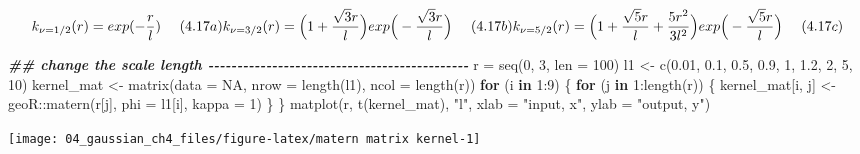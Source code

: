 \documentclass[
]{article}
\newenvironment{Shaded}{\begin{snugshade}}{\end{snugshade}}
\newcommand{\AttributeTok}[1]{\textcolor[rgb]{0.77,0.63,0.00}{#1}}
\newcommand{\ConstantTok}[1]{\textcolor[rgb]{0.00,0.00,0.00}{#1}}
\newcommand{\ControlFlowTok}[1]{\textcolor[rgb]{0.13,0.29,0.53}{\textbf{#1}}}
\newcommand{\DecValTok}[1]{\textcolor[rgb]{0.00,0.00,0.81}{#1}}
\newcommand{\DocumentationTok}[1]{\textcolor[rgb]{0.56,0.35,0.01}{\textbf{\textit{#1}}}}
\newcommand{\FloatTok}[1]{\textcolor[rgb]{0.00,0.00,0.81}{#1}}
\newcommand{\FunctionTok}[1]{\textcolor[rgb]{0.00,0.00,0.00}{#1}}
\newcommand{\NormalTok}[1]{#1}
\newcommand{\OtherTok}[1]{\textcolor[rgb]{0.56,0.35,0.01}{#1}}
\newcommand{\SpecialCharTok}[1]{\textcolor[rgb]{0.00,0.00,0.00}{#1}}
\newcommand{\StringTok}[1]{\textcolor[rgb]{0.31,0.60,0.02}{#1}}
\begin{document}
\[
k_{\nu=1/2}(r) = exp(-\frac r l) \ \ \ \ (4.17a)\\ 
k_{\nu=3/2}(r) = \Big(1 + \frac {\sqrt 3r} l \Big)
exp \Big(- \frac {\sqrt 3r} {l}\Big) \ \ \ \ (4.17b)\\ 
k_{\nu=5/2}(r) = \Big(1 + \frac {\sqrt 5r} l + 
\frac {5r^2} {3l^2}\Big) exp \Big(- \frac {\sqrt 5r} l\Big)
\ \ \ \ (4.17c)
\]

\begin{Shaded}
\begin{Highlighting}[]
\DocumentationTok{\#\# change the scale length {-}{-}{-}{-}{-}{-}{-}{-}{-}{-}{-}{-}{-}{-}{-}{-}{-}{-}{-}{-}{-}{-}{-}{-}{-}{-}{-}{-}{-}{-}{-}{-}{-}{-}{-}{-}{-}{-}{-}{-}{-}{-}{-}{-}{-}}
\NormalTok{r }\OtherTok{=} \FunctionTok{seq}\NormalTok{(}\DecValTok{0}\NormalTok{, }\DecValTok{3}\NormalTok{, }\AttributeTok{len =} \DecValTok{100}\NormalTok{)}
\NormalTok{l1 }\OtherTok{\textless{}{-}} \FunctionTok{c}\NormalTok{(}\FloatTok{0.01}\NormalTok{, }\FloatTok{0.1}\NormalTok{,  }\FloatTok{0.5}\NormalTok{,}
         \FloatTok{0.9}\NormalTok{,   }\DecValTok{1}\NormalTok{,  }\FloatTok{1.2}\NormalTok{, }
           \DecValTok{2}\NormalTok{,   }\DecValTok{5}\NormalTok{,  }\DecValTok{10}\NormalTok{)}
\NormalTok{kernel\_mat }\OtherTok{\textless{}{-}} \FunctionTok{matrix}\NormalTok{(}\AttributeTok{data =} \ConstantTok{NA}\NormalTok{, }\AttributeTok{nrow =} \FunctionTok{length}\NormalTok{(l1), }\AttributeTok{ncol =} \FunctionTok{length}\NormalTok{(r))}
\ControlFlowTok{for}\NormalTok{ (i }\ControlFlowTok{in} \DecValTok{1}\SpecialCharTok{:}\DecValTok{9}\NormalTok{) \{}
  \ControlFlowTok{for}\NormalTok{ (j }\ControlFlowTok{in} \DecValTok{1}\SpecialCharTok{:}\FunctionTok{length}\NormalTok{(r)) \{}
\NormalTok{    kernel\_mat[i, j] }\OtherTok{\textless{}{-}}\NormalTok{ geoR}\SpecialCharTok{::}\FunctionTok{matern}\NormalTok{(r[j], }\AttributeTok{phi =}\NormalTok{ l1[i], }\AttributeTok{kappa =} \DecValTok{1}\NormalTok{)}
\NormalTok{  \}}
\NormalTok{\}}
\FunctionTok{matplot}\NormalTok{(r, }\FunctionTok{t}\NormalTok{(kernel\_mat), }\StringTok{"l"}\NormalTok{, }
        \AttributeTok{xlab =} \StringTok{"input, x"}\NormalTok{, }\AttributeTok{ylab =} \StringTok{"output, y"}\NormalTok{)}
\end{Highlighting}
\end{Shaded}

\begin{center}\texttt{[image: 04\_gaussian\_ch4\_files/figure-latex/matern matrix kernel-1]} \end{center}
\end{document}
